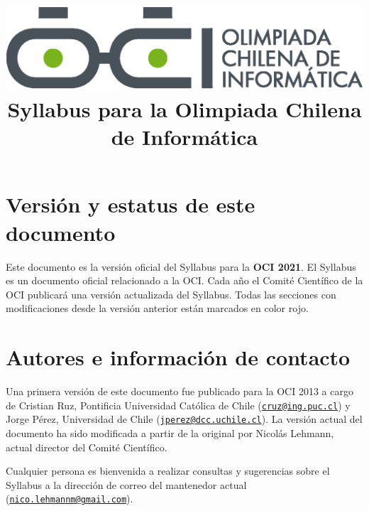 \documentclass{article}
\newcommand{\new}{\color{red}}
\begin{document}
\title{
    \includegraphics[scale=0.2]{OCIlogo.eps}\\
    \vskip 20pt
    Syllabus para la Olimpiada Chilena de Informática}
\date{}
\maketitle

\section{Versión y estatus de este documento}
Este documento es la versión oficial del Syllabus para la \textbf{OCI 2021}.
El Syllabus es un documento oficial relacionado a la OCI.
Cada año el Comité Científico de la OCI publicará una versión actualizada del Syllabus.
{\new
  Todas las secciones con modificaciones desde la versión anterior están marcados en color rojo.
}

\section{Autores e información de contacto}
Una primera versión de este documento fue publicado para la OCI 2013 a cargo de
Cristian Ruz, Pontificia Universidad Católica de Chile (\href{mailto:cruz@ing.puc.cl}{\nolinkurl{cruz@ing.puc.cl}}) y
Jorge Pérez, Universidad de Chile (\href{mailto:jperez@dcc.uchile.cl}{\nolinkurl{jperez@dcc.uchile.cl}}).
La versión actual del documento ha sido modificada a partir de la original por Nicolás Lehmann, actual director del Comité Científico.

Cualquier persona es bienvenida a realizar consultas y sugerencias sobre el
Syllabus a la dirección de correo del mantenedor actual (\href{mailto:nico.lehmannm@gmail.com}{\nolinkurl{nico.lehmannm@gmail.com}}).
\end{document}
